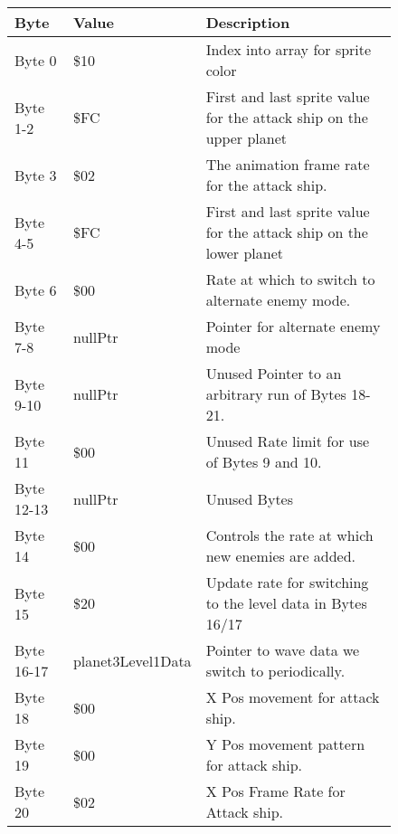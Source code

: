 \begin{figure}[H]
  {
  \setlength{\tabcolsep}{3.0pt}
  \setlength\cmidrulewidth{\heavyrulewidth} %
  \begin{adjustbox}{width=12cm}

\begin{tabular}{lll}
\toprule
 Byte       & Value             & Description                                                         \\
\midrule
 Byte 0     & \$10               & Index into array for sprite color                                   \\
 Byte 1-2   & \$FC               & First and last sprite value for the attack ship on the upper planet \\
 Byte 3     & \$02               & The animation frame rate for the attack ship.                       \\
 Byte 4-5   & \$FC               & First and last sprite value for the attack ship on the lower planet \\
 Byte 6     & \$00               & Rate at which to switch to alternate enemy mode.                    \\
 Byte 7-8   & nullPtr           & Pointer for alternate enemy mode                                    \\
 Byte 9-10  & nullPtr           & Unused Pointer to an arbitrary run of Bytes 18-21.                  \\
 Byte 11    & \$00               & Unused Rate limit for use of Bytes 9 and 10.                        \\
 Byte 12-13 & nullPtr           & Unused Bytes                                                        \\
 Byte 14    & \$00               & Controls the rate at which new enemies are added.                   \\
 Byte 15    & \$20               & Update rate for switching to the level data in Bytes 16/17          \\
 Byte 16-17 & planet3Level1Data & Pointer to wave data we switch to periodically.                     \\
 Byte 18    & \$00               & X Pos movement for attack ship.                                     \\
 Byte 19    & \$00               & Y Pos movement pattern for attack ship.                             \\
 Byte 20    & \$02               & X Pos Frame Rate for Attack ship.                                   \\

\end{tabular}
\end{adjustbox}}
\end{figure}

